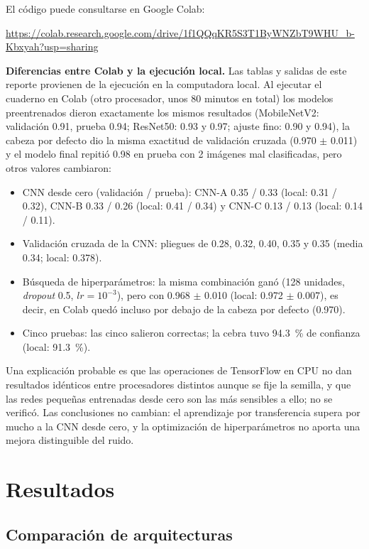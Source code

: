 \documentclass[11pt,letterpaper]{article}
\begin{document}
El código puede consultarse en Google Colab:

\begin{center}
    \url{https://colab.research.google.com/drive/1f1QQqKR5S3T1ByWNZbT9WHU_b-Kbxyah?usp=sharing}
\end{center}

\textbf{Diferencias entre Colab y la ejecución local.} Las tablas y salidas de este reporte provienen de la ejecución en la computadora local. Al ejecutar el cuaderno en Colab (otro procesador, unos 80 minutos en total) los modelos preentrenados dieron exactamente los mismos resultados (MobileNetV2: validación 0.91, prueba 0.94; ResNet50: 0.93 y 0.97; ajuste fino: 0.90 y 0.94), la cabeza por defecto dio la misma exactitud de validación cruzada (0.970 $\pm$ 0.011) y el modelo final repitió 0.98 en prueba con 2 imágenes mal clasificadas, pero otros valores cambiaron:
\begin{itemize}
    \item CNN desde cero (validación / prueba): CNN-A 0.35 / 0.33 (local: 0.31 / 0.32), CNN-B 0.33 / 0.26 (local: 0.41 / 0.34) y CNN-C 0.13 / 0.13 (local: 0.14 / 0.11).
    \item Validación cruzada de la CNN: pliegues de 0.28, 0.32, 0.40, 0.35 y 0.35 (media 0.34; local: 0.378).
    \item Búsqueda de hiperparámetros: la misma combinación ganó (128 unidades, \textit{dropout} 0.5, $\mathit{lr}=10^{-3}$), pero con 0.968 $\pm$ 0.010 (local: 0.972 $\pm$ 0.007), es decir, en Colab quedó incluso por debajo de la cabeza por defecto (0.970).
    \item Cinco pruebas: las cinco salieron correctas; la cebra tuvo 94.3~\% de confianza (local: 91.3~\%).
\end{itemize}
Una explicación probable es que las operaciones de TensorFlow en CPU no dan resultados idénticos entre procesadores distintos aunque se fije la semilla, y que las redes pequeñas entrenadas desde cero son las más sensibles a ello; no se verificó. Las conclusiones no cambian: el aprendizaje por transferencia supera por mucho a la CNN desde cero, y la optimización de hiperparámetros no aporta una mejora distinguible del ruido.

\section{Resultados}

\subsection{Comparación de arquitecturas}
\end{document}
